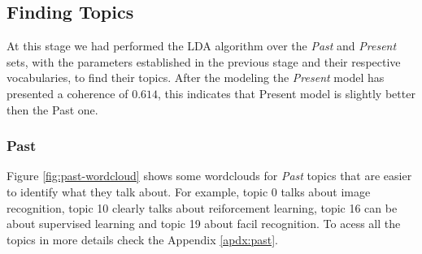 \subsection{Finding Topics}

At this stage we had performed the LDA algorithm over the \textit{Past} and \textit{Present} sets, with the parameters established in the previous stage and their respective vocabularies, to find their topics. After the modeling the \textit{Present} model has presented a coherence of $0.614$, this indicates that Present model is slightly better then the Past one.

\subsubsection{Past}

Figure \ref{fig:past-wordcloud} shows some wordclouds for \textit{Past} topics that are easier to identify what they talk about. For example, topic 0 talks about image recognition, topic 10 clearly talks about reiforcement learning, topic 16 can be about supervised learning and topic 19 about facil recognition. To acess all the topics in more details check the Appendix \ref{apdx:past}.


